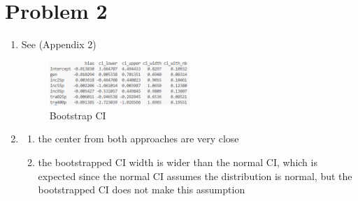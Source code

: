 \documentclass{article}
\begin{document}
\newpage
\section*{Problem 2}

\begin{enumerate}[label=(\alph*)]
  \item See (Appendix 2)
  \begin{figure}[h]
      \centering
      \includegraphics[width=0.5\textwidth]{2a.png}
      \caption{Bootstrap CI}
  \end{figure}
  \item
    \begin{enumerate}[label=(\roman*)]
      \item the center from both approaches are very close
      \item the bootstrapped CI width is wider than the normal CI, which is expected since the normal CI assumes the distribution is normal, but the bootstrapped CI does not make this assumption

    \end{enumerate}
\end{enumerate}

\newpage
\end{document}
